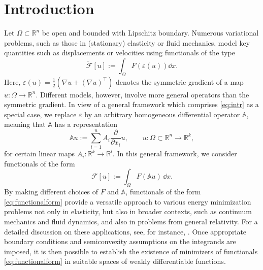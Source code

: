 \documentclass[a4paper,11pt]{amsart}
\numberwithin{equation}{section}
\newcommand{\R}{\mathbb{R}}
\begin{document}
	\section{Introduction}
	Let $\Omega\subset\R^{n}$ be open and bounded with Lipschitz boundary. Numerous variational problems, such as those in (stationary) elasticity or fluid mechanics, model key quantities such as displacements or velocities using functionals of the type 
	\begin{equation}
		\widetilde{\mathcal{F}}[u] :=  \int_\Omega F(\varepsilon(u)) \dd{x}. \label{eq:intr}
	\end{equation}
	Here, $\varepsilon(u) = \frac{1}{2} \left( \nabla u + (\nabla u)^\top \right)$ denotes the symmetric gradient of a map  $u\colon\Omega\to\R^{n}$. Different models, however,  involve more general operators than the symmetric gradient.  
	In view of a general framework which comprises \eqref{eq:intr} as a special case, we replace $\varepsilon$ by an arbitrary homogeneous differential operator $\mathbb{A}$, meaning that $\mathbb{A}$ has a  representation \begin{equation}\label{eq:diffop}\mathbb{A}u := \sum_{i=1}^n A_i \frac{\partial}{\partial x_i} u,\qquad u\colon \Omega\subset\R^{n}\to \R^{k}, 
	\end{equation}
	for certain linear maps {$A_{i}\colon \mathbb{R}^k \to \mathbb{R}^l$.} In this general framework, we consider functionals of the form
	\begin{equation}\label{eq:functionalform}
		\mathcal{F}[u] := \int_\Omega F(\mathbb{A}u) \, \dd{x}.
	\end{equation}
	By making different choices of $F$ and $\mathbb{A}$, functionals of the form \eqref{eq:functionalform} provide a versatile approach to various energy minimization problems not only in elasticity, but also in broader contexts, such as continuum mechanics and fluid dynamics, {and also in problems from general relativity}. For a detailed discussion on these applications, see, for instance, \cite{bartnik_constraint_2004,BehnGmeinederSchiffer, conti_symmetric_2020, dain, FonsecaMuller, friedrichs_boundary-value_1947, fuchs_variational_2000}. Once  {appropriate} boundary conditions and semiconvexity assumptions on the integrands are imposed, it is then possible to establish the existence of minimizers of functionals \eqref{eq:functionalform} in suitable spaces of weakly differentiable functions.
	
\end{document}
